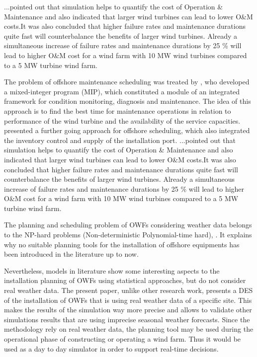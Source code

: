 \cite{Hofmann2014} ...pointed out that simulation helps to quantify the cost of Operation \& Maintenance  and also indicated that larger wind turbines can lead to lower O\&M costs.It was also concluded that higher failure rates and maintenance durations quite fast will counterbalance the benefits of larger wind turbines. Already a simultaneous increase of failure rates and maintenance durations by 25 \% will lead to higher O\&M cost for a wind farm with 10 MW wind turbines compared to a 5 MW turbine wind farm. 



The problem of offshore maintenance scheduling was treated by \cite{Kovacs2011497}, who developed a mixed-integer program (MIP), which constituted a module of an integrated framework for condition monitoring, diagnosis and maintenance. The idea of this approach is to find the best time for maintenance operations in relation to performance of the wind turbine and the availability of
the service capacities.
\cite{ISOPE2012} presented a further going approach for offshore scheduling, which also integrated the inventory control and supply 
of the installation port.
\cite{Hofmann2014} ...pointed out that simulation helps to quantify the cost of Operation \& Maintenance  and also indicated that 
larger wind turbines can lead to lower O\&M costs.It was also concluded that higher failure rates and maintenance durations quite 
fast will counterbalance the benefits of larger wind turbines. Already a simultaneous increase of failure rates and maintenance 
durations by 25 \% will lead to higher O\&M cost for a wind farm with 10 MW wind turbines compared to a 5 MW turbine wind farm. 


The planning and scheduling problem of OWFs considering weather data belongs to the NP-hard problems (Non-deterministic Polynomial-time hard), \cite{leeuwen1990}. It explains why no suitable planning tools for the installation of offshore equipments has been introduced in the literature up to now. 

Nevertheless, models in literature show some interesting aspects to the installation planning of OWFs using statistical approaches, but do not consider real weather data. The present paper, unlike other research work, presents a DES of the installation of OWFs that is using real weather data of a specific site. This makes the results of the simulation way more precise and allows to validate other simulations results that are using imprecise seasonal weather forecasts. Since the methodology rely on real weather data, the planning tool may be used during the operational phase of constructing or operating a wind farm. Thus it would be used as a day to day simulator in order to support real-time decisions.

